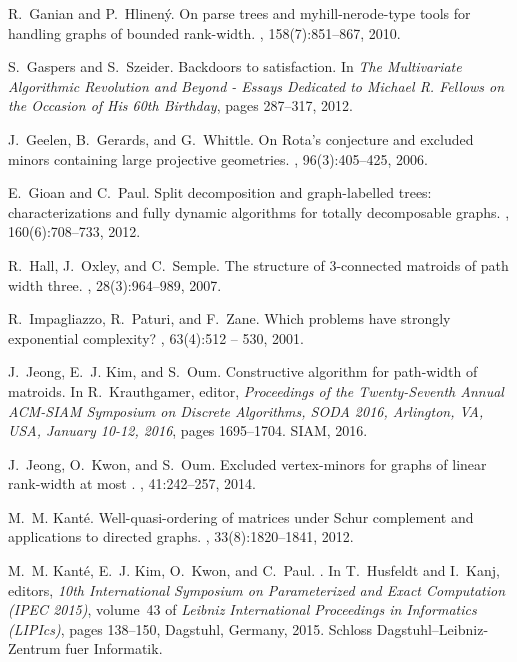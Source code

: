 \documentclass[11pt]{article}
\theoremstyle{remark}
\begin{document}
\begin{thebibliography}{10}
R.~Ganian and P.~Hlinen{\'{y}}.
\newblock On parse trees and myhill-nerode-type tools for handling graphs of
  bounded rank-width.
, 158(7):851--867, 2010.

S.~Gaspers and S.~Szeider.
\newblock Backdoors to satisfaction.
\newblock In {\em The Multivariate Algorithmic Revolution and Beyond - Essays
  Dedicated to Michael R. Fellows on the Occasion of His 60th Birthday}, pages
  287--317, 2012.

J.~Geelen, B.~Gerards, and G.~Whittle.
\newblock On {R}ota's conjecture and excluded minors containing large
  projective geometries.
, 96(3):405--425, 2006.

E.~Gioan and C.~Paul.
\newblock Split decomposition and graph-labelled trees: characterizations and
  fully dynamic algorithms for totally decomposable graphs.
, 160(6):708--733, 2012.

R.~Hall, J.~Oxley, and C.~Semple.
\newblock The structure of 3-connected matroids of path width three.
, 28(3):964--989, 2007.

R.~Impagliazzo, R.~Paturi, and F.~Zane.
\newblock Which problems have strongly exponential complexity?
, 63(4):512 -- 530,
  2001.

J.~Jeong, E.~J. Kim, and S.~Oum.
\newblock Constructive algorithm for path-width of matroids.
\newblock In R.~Krauthgamer, editor, {\em Proceedings of the Twenty-Seventh
  Annual {ACM-SIAM} Symposium on Discrete Algorithms, {SODA} 2016, Arlington,
  VA, USA, January 10-12, 2016}, pages 1695--1704. {SIAM}, 2016.

J.~Jeong, O.~Kwon, and S.~Oum.
\newblock Excluded vertex-minors for graphs of linear rank-width at most {}.
, 41:242--257, 2014.

M.~M. Kant{\'e}.
\newblock Well-quasi-ordering of matrices under {S}chur complement and
  applications to directed graphs.
, 33(8):1820--1841, 2012.

M.~M. Kant{\'e}, E.~J. Kim, O.~Kwon, and C.~Paul.
.
\newblock In T.~Husfeldt and I.~Kanj, editors, {\em 10th International
  Symposium on Parameterized and Exact Computation (IPEC 2015)}, volume~43 of
  {\em Leibniz International Proceedings in Informatics (LIPIcs)}, pages
  138--150, Dagstuhl, Germany, 2015. Schloss Dagstuhl--Leibniz-Zentrum fuer
  Informatik.


\end{thebibliography}
\end{document}
